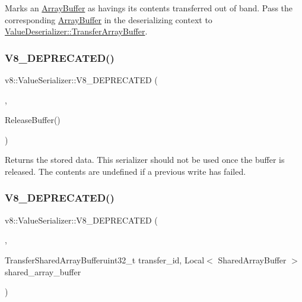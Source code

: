 Marks an \mbox{\hyperlink{classv8_1_1ArrayBuffer}{Array\+Buffer}} as havings its contents transferred out of band. Pass the corresponding \mbox{\hyperlink{classv8_1_1ArrayBuffer}{Array\+Buffer}} in the deserializing context to \mbox{\hyperlink{classv8_1_1ValueDeserializer_a853acc2c7b30571d6719ddd92a48da3b}{Value\+Deserializer\+::\+Transfer\+Array\+Buffer}}. \mbox{\label{classv8_1_1ValueSerializer_a64a2c151142bc706a446d15599541ca4}} 
\subsubsection{\texorpdfstring{V8\+\_\+\+D\+E\+P\+R\+E\+C\+A\+T\+E\+D()}{V8\_DEPRECATED()}\hspace{0.1cm}{\footnotesize\ttfamily [1/2]}}
{\footnotesize\ttfamily v8\+::\+Value\+Serializer\+::\+V8\+\_\+\+D\+E\+P\+R\+E\+C\+A\+T\+ED (\begin{DoxyParamCaption}\item[{\char`\"{}Use \mbox{\hyperlink{classv8_1_1ValueSerializer_abab0c48c963cd11f98478a4ccc04509c}{Release}}()\char`\"{}}]{,  }\item[{std\+::vector$<$ uint8\+\_\+t $>$ }]{Release\+Buffer() }\end{DoxyParamCaption})}

Returns the stored data. This serializer should not be used once the buffer is released. The contents are undefined if a previous write has failed. \mbox{\label{classv8_1_1ValueSerializer_a4f7e5fe4298a8094817fe9f639112499}} 
\subsubsection{\texorpdfstring{V8\+\_\+\+D\+E\+P\+R\+E\+C\+A\+T\+E\+D()}{V8\_DEPRECATED()}\hspace{0.1cm}{\footnotesize\ttfamily [2/2]}}
{\footnotesize\ttfamily v8\+::\+Value\+Serializer\+::\+V8\+\_\+\+D\+E\+P\+R\+E\+C\+A\+T\+ED (\begin{DoxyParamCaption}\item[{\char`\"{}Use \mbox{\hyperlink{classv8_1_1ValueSerializer_1_1Delegate_a963946ef185d992552e8d9e0e4016137}{Delegate\+::\+Get\+Shared\+Array\+Buffer\+Id}}\char`\"{}}]{,  }\item[{void }]{Transfer\+Shared\+Array\+Bufferuint32\+\_\+t transfer\+\_\+id, Local$<$ Shared\+Array\+Buffer $>$ shared\+\_\+array\+\_\+buffer }\end{DoxyParamCaption})}

